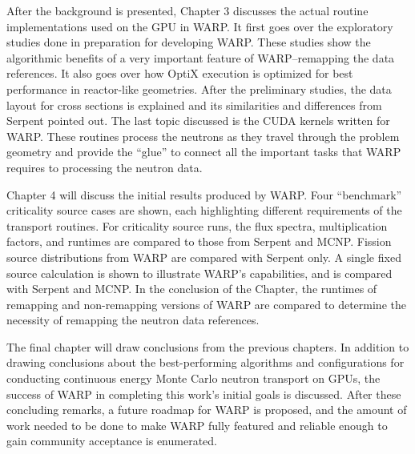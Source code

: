 After the background is presented, Chapter 3 discusses the actual routine implementations used on the GPU in WARP.  It first goes over the exploratory studies done in preparation for developing WARP.  These studies show the algorithmic benefits of a very important feature of WARP--remapping the data references.  It also goes over how OptiX execution is optimized for best performance in reactor-like geometries.  After the preliminary studies, the data layout for cross sections is explained and its similarities and differences from Serpent pointed out.  The last topic discussed is the CUDA kernels written for WARP.  These routines process the neutrons as they travel through the problem geometry and provide the ``glue'' to connect all the important tasks that WARP requires to processing the neutron data.

Chapter 4 will discuss the initial results produced by WARP.  Four ``benchmark'' criticality source cases are shown, each highlighting different requirements of the transport routines.  For criticality source runs, the flux spectra, multiplication factors, and runtimes are compared to those from Serpent and MCNP.  Fission source distributions from WARP are compared with Serpent only.  A single fixed source calculation is shown to illustrate WARP's capabilities, and is compared with Serpent and MCNP.  In the conclusion of the Chapter, the runtimes of remapping and non-remapping versions of WARP are compared to determine the necessity of remapping the neutron data references.

The final chapter will draw conclusions from the previous chapters.  In addition to drawing conclusions about the best-performing algorithms and configurations for conducting continuous energy Monte Carlo neutron transport on GPUs, the success of WARP in completing this work's initial goals is discussed.  After these concluding remarks, a future roadmap for WARP is proposed, and the amount of work needed to be done to make WARP fully featured and reliable enough to gain community acceptance is enumerated.





